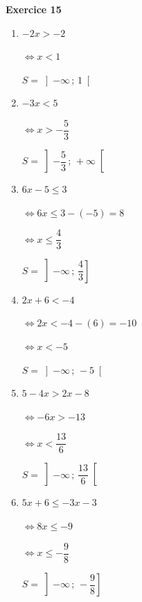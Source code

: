 \documentclass[12pt,a4paper,french]{article}
\begin{document}
\noindent\textbf{Exercice 15}\par
\smallskip
\begin{enumerate}
\item $-2x > -2$

$\Leftrightarrow x < 1$

$S = \left] -\infty \,;\, 1 \right[$
\item $-3x < 5$

$\Leftrightarrow x > - \dfrac{5}{3}$

$S = \left] - \dfrac{5}{3} \,;\, +\infty \right[$
\item $6 x - 5 \leq 3$

$\Leftrightarrow 6x \leq 3 - (-5) = 8$

$\Leftrightarrow x \leq \dfrac{4}{3}$

$S = \left] -\infty \,;\, \dfrac{4}{3} \right]$
\item $2 x + 6 < -4$

$\Leftrightarrow 2x < -4 - (6) = -10$

$\Leftrightarrow x < -5$

$S = \left] -\infty \,;\, -5 \right[$
\item $5 - 4 x > 2 x - 8$

$\Leftrightarrow -6x > -13$

$\Leftrightarrow x < \dfrac{13}{6}$

$S = \left] -\infty \,;\, \dfrac{13}{6} \right[$
\item $5 x + 6 \leq - 3 x - 3$

$\Leftrightarrow 8x \leq -9$

$\Leftrightarrow x \leq - \dfrac{9}{8}$

$S = \left] -\infty \,;\, - \dfrac{9}{8} \right]$
\end{enumerate}
\medskip
\end{document}
